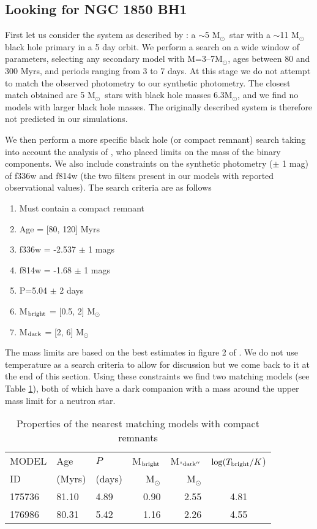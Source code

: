 \documentclass[fleqn,usenatbib]{mnras}
\newcommand{\msol} {M$_{\odot}$}
\newcommand{\about} {$\sim$}
\begin{document}
\subsection{Looking for NGC 1850 BH1}
First let us consider the system as described by \cite{saracino2021}: a \about 5 \msol\, star with a \about 11 \msol\, black hole primary in a 5 day orbit. 
We perform a search on a wide window of parameters, selecting any secondary model with M=3--7\msol, ages between 80 and 300 Myrs, and periods ranging from 3 to 7 days. 
At this stage we do not attempt to match the observed photometry to our synthetic photometry. 
The closest match obtained are 5 \msol\, stars with black hole masses 6.3\msol, and we find no models with larger black hole masses. 
The originally described system is therefore not predicted in our simulations.

We then perform a more specific black hole (or compact remnant) search taking into account the analysis of \cite{el-badry2021}, who placed limits on the mass of the binary components.
We also include constraints on the synthetic photometry ($\pm$ 1 mag) of f336w and f814w (the two filters present in our models with reported observational values). 
The search criteria are as follows
\begin{enumerate}
    \item Must contain a compact remnant
    \item Age = [80, 120] Myrs
    \item f336w = -2.537 $\pm$ 1 mags
    \item f814w = -1.68 $\pm$ 1 mags
    \item P=5.04 $\pm$ 2 days
    \item M$_{\rm bright}$ = [0.5, 2] \msol 
    \item M$_{\rm dark}$ = [2, 6] \msol 
\end{enumerate}

The mass limits are based on the best estimates in figure 2 of \citealt{el-badry2021}.
We do not use temperature as a search criteria to allow for discussion but we come back to it at the end of this section. 
Using these constraints we find two matching models (see Table \ref{tab:bh_search}), both of which have a dark companion with a mass around the upper mass limit for a neutron star. 

\begin{table}
    \centering
    \caption{Properties of the nearest matching models with compact remnants}
    \label{tab:bh_search}
    \begin{tabular}{lllrrc}
    \hline
     MODEL  & Age  &   $P$  &    M$_{\rm bright}$ &    M$_{\rm ``dark''}$ &  $\log(T_{\rm bright}/K$) \\
     ID &  (Myrs) &  (days) &    \msol &    \msol &   \\
    \hline
       175736 &  81.10 &  4.89 &  0.90 &  2.55 &     4.81 \\
     \hline
       176986 &  80.31 &  5.42 &  1.16 &  2.26 &     4.55 \\
\hline
\end{tabular}
\end{table}
\end{document}
